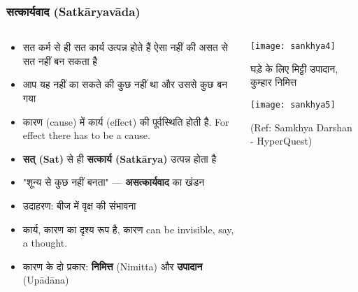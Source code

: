 \begin{frame}[fragile]\frametitle{सत्कार्यवाद (Satkāryavāda)}
\begin{columns}
    \begin{column}[T]{0.6\linewidth}
      \begin{itemize}
		\item सत कर्म से ही सत कार्य उत्पन्न होते हैं ऐसा नहीं की असत से सत नहीं बन सकता है 
		\item आप यह नहीं का सकते की कुछ नहीं था और उससे कुछ बन गया
        \item कारण (cause) में कार्य (effect) की पूर्वस्थिति होती है. For effect there has to be a cause.
        \item \textbf{सत् (Sat)} से ही \textbf{सत्कार्य (Satkārya)} उत्पन्न होता है
        \item "शून्य से कुछ नहीं बनता" — \textbf{असत्कार्यवाद} का खंडन
        \item उदाहरण: बीज में वृक्ष की संभावना
        \item कार्य, कारण का दृश्य रूप है, कारण can be invisible, say, a thought.
        \item कारण के दो प्रकार: \textbf{निमित्त} (Nimitta) और \textbf{उपादान} (Upādāna)

      \end{itemize}
    \end{column}
    \begin{column}[T]{0.4\linewidth}
      \begin{center}
        \texttt{[image: sankhya4]}
		
		घड़े के लिए मिट्टी उपादान, कुम्हार निमित्त
		
        \texttt{[image: sankhya5]}
		
		{\tiny (Ref: Samkhya Darshan - HyperQuest)}
		
      \end{center}	
    \end{column}
\end{columns}
\end{frame}

